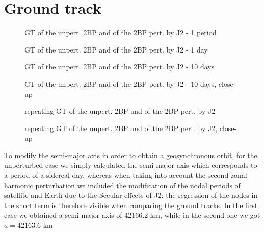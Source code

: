 \documentclass[11pt,a4paper]{report}
\begin{document}
\section{Ground track}
\begin{figure}[H]
\centering
{}
\caption{GT of the unpert. 2BP and of the 2BP pert. by J2 - 1 period}
\end{figure}
\begin{figure}[H]
\centering
{}
\caption{GT of the unpert. 2BP and of the 2BP pert. by J2 - 1 day}
\end{figure}
\begin{figure}[H]
\centering
{}
\caption{GT of the unpert. 2BP and of the 2BP pert. by J2 - 10 days}
\end{figure}
\begin{figure}[H]
\centering
{}
\caption{GT of the unpert. 2BP and of the 2BP pert. by J2 - 10 days, close-up}
\end{figure}
\begin{figure}[H]
\centering
{}
\caption{repeating GT of the unpert. 2BP and of the 2BP pert. by J2}
\end{figure}
\begin{figure}[H]
\centering
{}
\caption{repeating GT of the unpert. 2BP and of the 2BP pert. by J2, close-up}
\end{figure}

To modify the semi-major axis in order to obtain a geosynchronous orbit, for the unperturbed case we simply calculated the semi-major axis which corresponds to a period of a sidereal day, whereas when taking into account the second zonal harmonic perturbation we included the modification of the nodal periods of satellite and Earth due to the Secular effects of J2: the regression of the nodes in the short term is therefore visible when comparing the ground tracks.
In the first case we obtained a semi-major axis of 42166.2 km, while in the second one we got $a = 42163.6$ km
\end{document}
